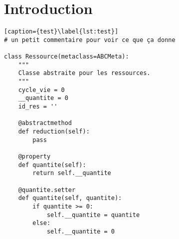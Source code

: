\section*{Introduction}


\begin{lstlisting}[caption={test}\label{lst:test}]
# un petit commentaire pour voir ce que ça donne

class Ressource(metaclass=ABCMeta):
	"""
	Classe abstraite pour les ressources.
	"""
	cycle_vie = 0
	__quantite = 0
	id_res = ''

	@abstractmethod
	def reduction(self):
		pass

	@property
	def quantite(self):
	    return self.__quantite

	@quantite.setter
	def quantite(self, quantite):
		if quantite >= 0:
			self.__quantite = quantite
		else:
			self.__quantite = 0
\end{lstlisting}

